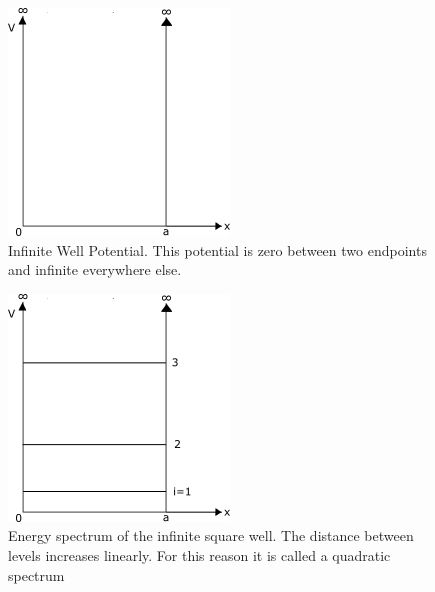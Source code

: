\begin{figure}[H]
    \centering
    \includegraphics[scale=0.75]{figures/pdf/sqwellpot.png}
    \caption{Infinite Well Potential. This potential is zero between two endpoints and infinite everywhere else.}
    \label{fig: Infinite Well Potential}
\end{figure}
\begin{figure}[H]
    \centering
    \includegraphics[scale=1.0]{figures/pdf/sqwellspec.png}
    \caption{Energy spectrum of the infinite square well. The distance between levels increases linearly. For this reason it is called a quadratic spectrum}
    \label{fig:Energy spectrum of the infinite square well}
\end{figure}
